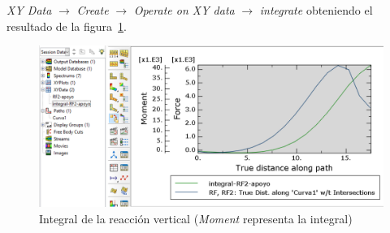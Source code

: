 \documentclass[spanish,a4paper,12pt]{article}
\begin{document}
\emph{XY Data} $\to$ \emph{Create} $\to$ \emph{Operate on XY data} $\to$ \emph{integrate}
obteniendo el resultado de la figura~\ref{fig:int-reac-vert}.
\begin{figure}[!htbp]
\centering
\includegraphics[scale=0.45]{capturas2019/a_fig42p.png}
\caption{Integral de la reacción vertical (\emph{Moment} representa la integral)}
\label{fig:int-reac-vert}
\end{figure}
\end{document}

